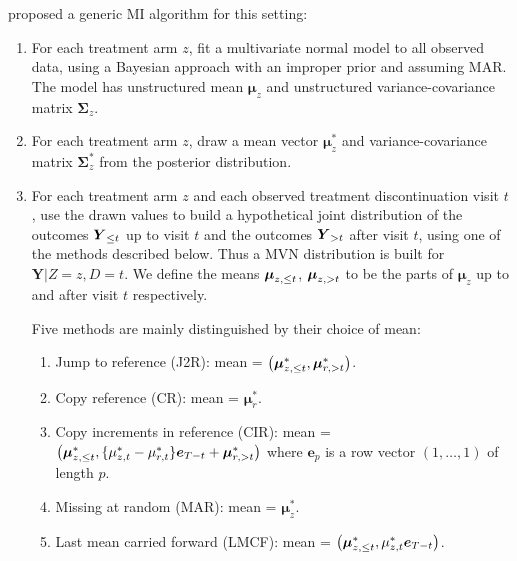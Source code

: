 \citet{Carpenter++13}  proposed a generic MI algorithm for this setting:
\begin{enumerate}

\item For each treatment arm $z$, fit a multivariate normal model to all observed data, using a
    Bayesian approach with an improper prior and assuming MAR. The model has unstructured
    mean $\boldsymbol{\mu}_z$ and unstructured variance-covariance matrix $\boldsymbol{\Sigma}_z$.

\item For each treatment arm $z$, draw a mean vector $\boldsymbol{\mu}_z^*$ and variance-covariance matrix $\boldsymbol{\Sigma}_z^*$ from the posterior distribution.

\item For each treatment arm  $z$ and each observed treatment discontinuation visit $t$, use the drawn values to build a hypothetical  joint  distribution of 
the outcomes $\boldsymbol{Y}_{{\le{t}}}$ up to visit $t$ 
and 
the outcomes $\boldsymbol{Y}_{{>t}}$ after visit  $t$, 
using one of the methods described below.
Thus a MVN distribution is built for $\boldsymbol{Y}|Z=z,D=t$.
We define the means
$\boldsymbol{\mu}_{z,{\le{t}}}$,
$\boldsymbol{\mu}_{z,{>t}}$
to be the parts of $\boldsymbol{\mu}_{z}$ up to and after visit $t$ respectively.

Five methods are mainly distinguished by their choice of mean: 
\begin{enumerate}
\item Jump to reference (J2R):
mean = $\left( \boldsymbol{\mu}_{z,{\le{t}}}^*, \boldsymbol{\mu}_{r,{>t}}^* \right)$.

\item Copy reference (CR):
mean = $\boldsymbol{\mu}_r^*$.

\item Copy increments in reference (CIR):
mean = $\left( \boldsymbol{\mu}_{z,{\le{t}}}^*,  \{\mu_{z,t}^* - \mu_{r,t}^* \} \boldsymbol{e}_{T-t} + \boldsymbol{\mu}_{r,{>t}}^*   \right)$
where $\boldsymbol{e}_p$ is a row vector $(1,\ldots,1)$ of length $p$.

\item Missing at random (MAR): mean = $\boldsymbol{\mu}_z^*$.

\item Last mean carried forward (LMCF):
mean = $\left( \boldsymbol{\mu}_{z,{\le{t}}}^*, \mu_{z,t}^*\boldsymbol{e}_{T-t} \right)$.
\end{enumerate}


\end{enumerate}
